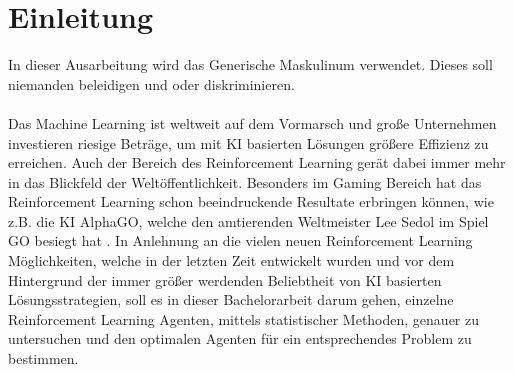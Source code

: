 \chapter{Einleitung} \label{chap:Einleitung}
In dieser Ausarbeitung wird das Generische Maskulinum verwendet. Dieses soll niemanden beleidigen und oder diskriminieren.\\
\\Das Machine Learning ist weltweit auf dem Vormarsch und große Unternehmen investieren riesige Beträge, um mit KI basierten Lösungen größere Effizienz zu erreichen. Auch der Bereich des Reinforcement Learning gerät dabei immer mehr in das Blickfeld der Weltöffentlichkeit. Besonders im Gaming Bereich hat das Reinforcement Learning schon beeindruckende Resultate erbringen können, wie z.B. die KI AlphaGO, welche den amtierenden Weltmeister Lee Sedol im Spiel GO besiegt hat \citep{UAV}. In Anlehnung an die vielen neuen Reinforcement Learning Möglichkeiten, welche in der letzten Zeit entwickelt wurden und vor dem Hintergrund der immer größer werdenden Beliebtheit von KI basierten Lösungsstrategien, soll es in dieser Bachelorarbeit darum gehen, einzelne Reinforcement Learning Agenten, mittels statistischer Methoden, genauer zu untersuchen und den optimalen Agenten für ein entsprechendes Problem zu bestimmen.

